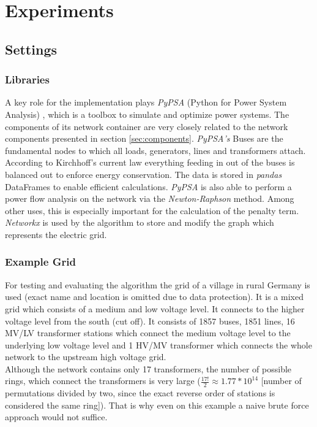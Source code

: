 \chapter{Experiments}\label{chap:experiments}

\section{Settings}
\subsection{Libraries}\label{pypsa}
A key role for the implementation plays \textit{PyPSA} (Python for Power System Analysis) \cite{brown2017pypsa}, which is a toolbox to simulate and optimize power systems. The components of its network container are very closely related to the network components presented in section \ref{sec:components}. \textit{PyPSA's} Buses are the fundamental nodes to which all loads, generators, lines and transformers attach. According to Kirchhoff's current law everything feeding in out of the buses is balanced out to enforce energy conservation. The data is stored in \textit{pandas} DataFrames to enable efficient calculations. \textit{PyPSA} is also able to perform a power flow analysis on the network via the \textit{Newton-Raphson} method. Among other uses, this is especially important for the calculation of the penalty term. \textit{Networkx} is used by the algorithm to store and modify the graph which represents the electric grid.

\subsection{Example Grid}
For testing and evaluating the algorithm the grid of a village in rural Germany is used (exact name and location is omitted due to data protection). It is a mixed grid which consists of a medium and low voltage level. It connects to the higher voltage level from the south (cut off). It consists of 1857 buses, 1851 lines, 16 MV/LV transformer stations which connect the medium voltage level to the underlying low voltage level and 1 HV/MV transformer which connects the whole network to the upstream high voltage grid. \\
Although the network contains only 17 transformers, the number of possible rings, which connect the transformers is very large ($\frac{17!}{2} \approx 1.77*10^{14}$ [number of permutations divided by two, since the exact reverse order of stations is considered the same ring]). That is why even on this example a naive brute force approach would not suffice.\\

